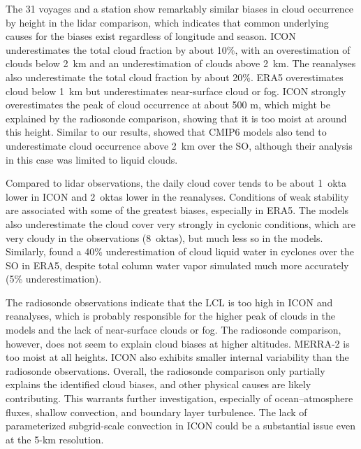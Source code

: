 \documentclass[draft]{agujournal2019}
\begin{document}
The 31 voyages and a station show remarkably similar biases in cloud occurrence by height in the lidar comparison, which indicates that common underlying causes for the biases exist regardless of longitude and season. ICON underestimates the total cloud fraction by about 10\%, with an overestimation of clouds below 2~km and an underestimation of clouds above 2~km. The reanalyses also underestimate the total cloud fraction by about 20\%. ERA5 overestimates cloud below 1~km but underestimates near-surface cloud or fog. ICON strongly overestimates the peak of cloud occurrence at about 500 m, which might be explained by the radiosonde comparison, showing that it is too moist at around this height. Similar to our results,  showed that CMIP6 models also tend to underestimate cloud occurrence above 2~km over the SO, although their analysis in this case was limited to liquid clouds.

Compared to lidar observations, the daily cloud cover tends to be about 1~okta lower in ICON and 2~oktas lower in the reanalyses. Conditions of weak stability are associated with some of the greatest biases, especially in ERA5. The models also underestimate the cloud cover very strongly in cyclonic conditions, which are very cloudy in the observations (8~oktas), but much less so in the models. Similarly,  found a 40\% underestimation of cloud liquid water in cyclones over the SO in ERA5, despite total column water vapor simulated much more accurately (5\% underestimation).

The radiosonde observations indicate that the LCL is too high in ICON and reanalyses, which is probably responsible for the higher peak of clouds in the models and the lack of near-surface clouds or fog. The radiosonde comparison, however, does not seem to explain cloud biases at higher altitudes. MERRA-2 is too moist at all heights. ICON also exhibits smaller internal variability than the radiosonde observations. Overall, the radiosonde comparison only partially explains the identified cloud biases, and other physical causes are likely contributing. This warrants further investigation, especially of ocean--atmosphere fluxes, shallow convection, and boundary layer turbulence. The lack of parameterized subgrid-scale convection in ICON could be a substantial issue even at the 5-km resolution.
\end{document}

